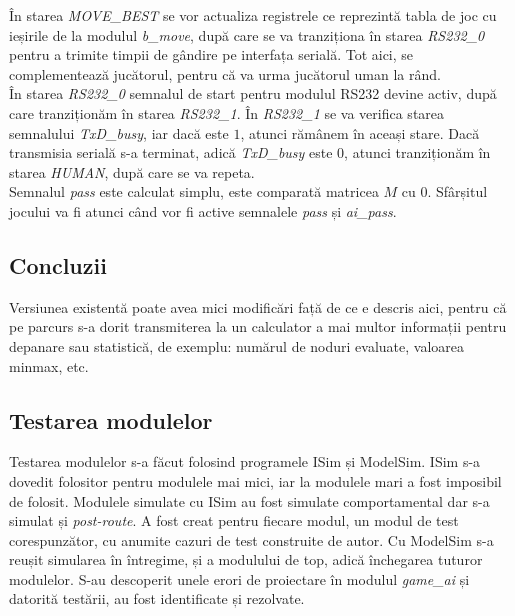 \documentclass[12pt,twoside,a4paper,fleqn]{book}
\theoremstyle{definition}
\begin{document}
În starea \emph{MOVE\_BEST} se vor actualiza registrele ce reprezintă tabla de joc cu ieșirile de la modulul \emph{b\_move}, după care se va tranziționa în starea \emph{RS232\_0} pentru a trimite timpii de gândire pe interfața serială. Tot aici, se complementează jucătorul, pentru că va urma jucătorul uman la rând.\\
În starea \emph{RS232\_0} semnalul de start pentru modulul RS232 devine activ, după care tranziționăm în starea \emph{RS232\_1}. În \emph{RS232\_1} se va verifica starea semnalului \emph{TxD\_busy}, iar dacă este $1$, atunci rămânem în aceași stare. Dacă transmisia serială s-a terminat, adică \emph{TxD\_busy} este $0$, atunci tranziționăm în starea \emph{HUMAN}, după care se va repeta.\\
Semnalul \emph{pass} este calculat simplu, este comparată matricea $M$ cu 0. Sfârșitul jocului va fi atunci când vor fi active semnalele \emph{pass} și \emph{ai\_pass}.

\subsection{Concluzii}
Versiunea existentă poate avea mici modificări față de ce e descris aici, pentru că pe parcurs s-a dorit transmiterea la un calculator a mai multor informații pentru depanare sau statistică, de exemplu: numărul de noduri evaluate, valoarea minmax, etc.

\subsection{Testarea modulelor}
\label{testare}
Testarea modulelor s-a făcut folosind programele ISim și ModelSim. ISim s-a dovedit folositor pentru modulele mai mici, iar la modulele mari a fost imposibil de folosit. Modulele simulate cu ISim au fost simulate comportamental dar s-a simulat și \emph{post-route}. A fost creat pentru fiecare modul, un modul de test corespunzător, cu anumite cazuri de test construite de autor. Cu ModelSim s-a reușit simularea în întregime, și a modulului de top, adică închegarea tuturor modulelor. S-au descoperit unele erori de proiectare în modulul \emph{game\_ai} și datorită testării, au fost identificate și rezolvate.
\end{document}

